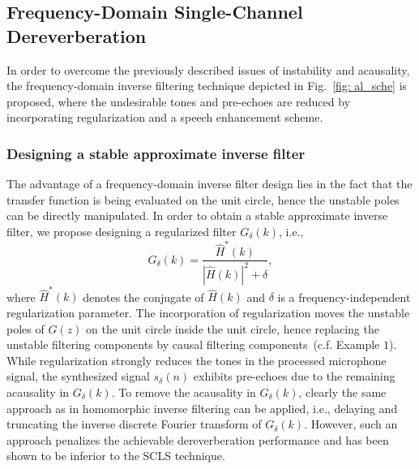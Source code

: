 \documentclass{article}
\begin{document}
\subsection{Frequency-Domain Single-Channel Dereverberation}
In order to overcome the previously described issues of instability and acausality, the frequency-domain inverse filtering technique depicted in Fig.~\ref{fig: al_sche} is proposed, where the undesirable tones and pre-echoes are reduced by incorporating regularization and a speech enhancement scheme.

\subsubsection{Designing a stable approximate inverse filter}

The advantage of a frequency-domain inverse filter design lies in the fact that the transfer function is being evaluated on the unit circle, hence the unstable poles can be directly manipulated.
In order to obtain a stable approximate inverse filter, we propose designing a regularized filter $G_{\delta}(k)$, i.e.,
\begin{equation}
  \label{eq: rfi}
  G_{\delta}(k) = \frac{\hat{H}^{*}(k)}{|\hat{H}(k)|^2 + \delta},
\end{equation}
where $\hat{H}^{*}(k)$ denotes the conjugate of $\hat{H}(k)$ and $\delta$ is a frequency-independent regularization parameter.
The incorporation of regularization moves the unstable poles of $G(z)$ on the unit circle inside the unit circle, hence replacing the unstable filtering components by causal filtering components~(c.f. Example $1$).
While regularization strongly reduces the tones in the processed microphone signal, the synthesized signal $s_{\delta}(n)$ exhibits pre-echoes due to the remaining acausality in $G_{\delta}(k)$.
To remove the acausality in $G_{\delta}(k)$, clearly the same approach as in homomorphic inverse filtering can be applied, i.e., delaying and truncating the inverse discrete Fourier transform of $G_{\delta}(k)$.
However, such an approach penalizes the achievable dereverberation performance and has been shown to be inferior to the SCLS technique. 
\end{document}
